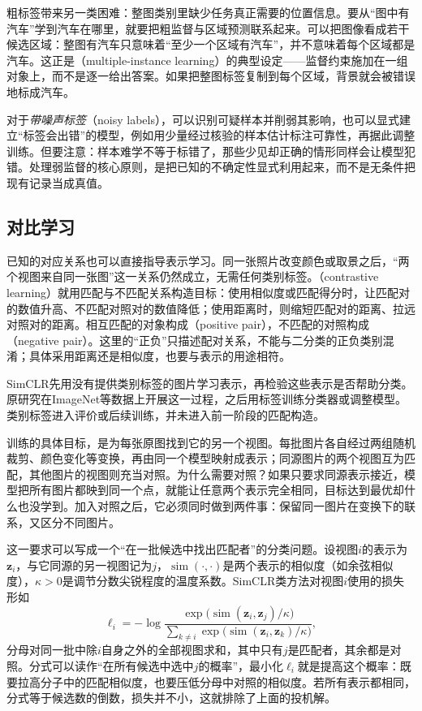 粗标签带来另一类困难：整图类别里缺少任务真正需要的位置信息。要从“图中有汽车”学到汽车在哪里，就要把粗监督与区域预测联系起来。可以把图像看成若干候选区域：整图有汽车只意味着“至少一个区域有汽车”，并不意味着每个区域都是汽车。这正是（multiple-instance learning）的典型设定——监督约束施加在一组对象上，而不是逐一给出答案。如果把整图标签复制到每个区域，背景就会被错误地标成汽车。

对于\emph{带噪声标签}（noisy labels），可以识别可疑样本并削弱其影响，也可以显式建立“标签会出错”的模型，例如用少量经过核验的样本估计标注可靠性，再据此调整训练。但要注意：样本难学不等于标错了，那些少见却正确的情形同样会让模型犯错。处理弱监督的核心原则，是把已知的不确定性显式利用起来，而不是无条件把现有记录当成真值。

\subsection{对比学习}
\label{sec:contrastive-learning}

已知的对应关系也可以直接指导表示学习。同一张照片改变颜色或取景之后，“两个视图来自同一张图”这一关系仍然成立，无需任何类别标签。（contrastive learning）就用匹配与不匹配关系构造目标：使用相似度或匹配得分时，让匹配对的数值升高、不匹配对照对的数值降低；使用距离时，则缩短匹配对的距离、拉远对照对的距离。相互匹配的对象构成（positive pair），不匹配的对照构成（negative pair）。这里的“正负”只描述配对关系，不能与二分类的正负类别混淆；具体采用距离还是相似度，也要与表示的用途相符。

SimCLR先用没有提供类别标签的图片学习表示，再检验这些表示是否帮助分类。原研究在ImageNet等数据上开展这一过程，之后用标签训练分类器或调整模型。类别标签进入评价或后续训练，并未进入前一阶段的匹配构造。

训练的具体目标，是为每张原图找到它的另一个视图。每批图片各自经过两组随机裁剪、颜色变化等变换，再由同一个模型映射成表示；同源图片的两个视图互为匹配，其他图片的视图则充当对照。为什么需要对照？如果只要求同源表示接近，模型把所有图片都映到同一个点，就能让任意两个表示完全相同，目标达到最优却什么也没学到。加入对照之后，它必须同时做到两件事：保留同一图片在变换下的联系，又区分不同图片。

这一要求可以写成一个“在一批候选中找出匹配者”的分类问题。设视图$i$的表示为$\bm{z}_i$，与它同源的另一视图记为$j$，$\operatorname{sim}(\cdot,\cdot)$是两个表示的相似度（如余弦相似度），$\kappa>0$是调节分数尖锐程度的温度系数。SimCLR类方法对视图$i$使用的损失形如
\begin{equation}
  \ell_i=-\log\frac{\exp\bigl(\operatorname{sim}(\bm{z}_i,\bm{z}_j)/\kappa\bigr)}
  {\sum_{k\neq i}\exp\bigl(\operatorname{sim}(\bm{z}_i,\bm{z}_k)/\kappa\bigr)},
  \label{eq:contrastive-loss-overview}
\end{equation}
分母对同一批中除$i$自身之外的全部视图求和，其中只有$j$是匹配者，其余都是对照。分式可以读作“在所有候选中选中$j$的概率”，最小化$\ell_i$就是提高这个概率：既要拉高分子中的匹配相似度，也要压低分母中对照的相似度。若所有表示都相同，分式等于候选数的倒数，损失并不小，这就排除了上面的投机解。

